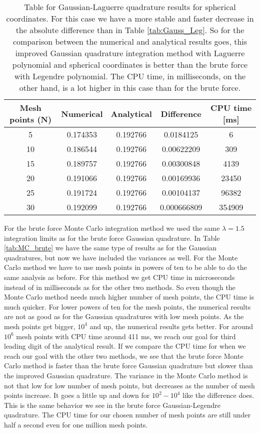 \documentclass[12pt,a4paper,english]{article}
\begin{document}
\begin{table}[htbp]
	\centering
	\begin{tabular}{ |c|c|c|c|c| }
		\hline \rule{0pt}{13pt}
		Mesh points (N) & Numerical & Analytical & Difference & CPU time [ms]\\
		\hline \rule{0pt}{13pt}
		5 & 0.174353 & 0.192766 & 0.0184125 & 6 \\
		\hline \rule{0pt}{13pt}
		10 & 0.186544 & 0.192766 & 0.00622209 & 309 \\
		\hline \rule{0pt}{13pt}
		15 & 0.189757 & 0.192766 & 0.00300848 & 4139 \\
		\hline \rule{0pt}{13pt}
		20 & 0.191066 & 0.192766 & 0.00169936 & 23450 \\
		\hline \rule{0pt}{13pt}
		25 & 0.191724 & 0.192766 & 0.00104137 & 96382 \\
		\hline \rule{0pt}{13pt}
		30 & 0.192099 & 0.192766 & 0.000666809 & 354909 \\
		\hline 
	\end{tabular}
	\caption{Table for Gaussian-Laguerre quadrature results for spherical coordinates. For this case we have a more stable and faster decrease in the absolute difference than in Table \ref{tab:Gauss_Leg}. So for the comparison between the numerical and analytical results goes, this improved Gaussian quadrature integration method with Laguerre polynomial and spherical coordinates is better than the brute force with Legendre polynomial. The CPU time, in milliseconds, on the other hand, is a lot higher in this case than for the brute force.}
	\label{tab:Gauss_Lag}
\end{table}
\newpage
For the brute force Monte Carlo integration method we used the same $\lambda=1.5$ integration limits as for the brute force Gaussian quadrature. In Table \ref{tab:MC_brute} we have the same type of results as for the Gaussian quadratures, but now we have included the variances as well. For the Monte Carlo method we have to use mesh points in powers of ten to be able to do the same analysis as before. For this method we get CPU time in microseconds instead of in milliseconds as for the other two methods. So even though the Monte Carlo method needs much higher number of mesh points, the CPU time is much quicker. For lower powers of ten for the mesh points, the numerical results are not as good as for the Gaussian quadratures with low mesh points. As the mesh points get bigger, $10^4$ and up, the numerical results gets better. For around $10^6$ mesh points with CPU time around 411 ms, we reach our goal for third leading digit of the analytical result. If we compare the CPU time for when we reach our goal with the other two methods, we see that the brute force Monte Carlo method is faster than the brute force Gaussian quadrature but slower than the improved Gaussian quadrature. The variance in the Monte Carlo method is not that low for low number of mesh points, but decreases as the number of mesh points increase. It goes a little up and down for $10^2-10^4$ like the difference does. This is the same behavior we see in the brute force Gaussian-Legendre quadrature. The CPU time for our chosen number of mesh points are still under half a second even for one million mesh points.
\end{document}
